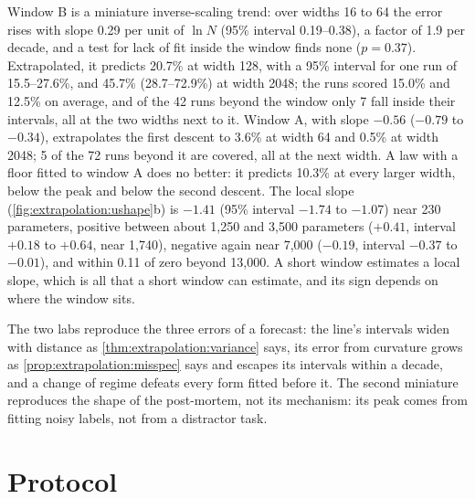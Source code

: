 \begin{refsection}
Window B is a miniature inverse-scaling trend: over widths 16 to 64 the error rises with slope 0.29 per unit of $\ln N$ (95\% interval 0.19--0.38), a factor of 1.9 per decade, and a test for lack of fit inside the window finds none ($p=0.37$). Extrapolated, it predicts 20.7\% at width 128, with a 95\% interval for one run of 15.5--27.6\%, and 45.7\% (28.7--72.9\%) at width 2048; the runs scored 15.0\% and 12.5\% on average, and of the 42 runs beyond the window only 7 fall inside their intervals, all at the two widths next to it. Window A, with slope $-0.56$ ($-0.79$ to $-0.34$), extrapolates the first descent to 3.6\% at width 64 and 0.5\% at width 2048; 5 of the 72 runs beyond it are covered, all at the next width. A law with a floor fitted to window A does no better: it predicts 10.3\% at every larger width, below the peak and below the second descent. The local slope (\cref{fig:extrapolation:ushape}b) is $-1.41$ (95\% interval $-1.74$ to $-1.07$) near 230 parameters, positive between about 1,250 and 3,500 parameters ($+0.41$, interval $+0.18$ to $+0.64$, near 1,740), negative again near 7,000 ($-0.19$, interval $-0.37$ to $-0.01$), and within 0.11 of zero beyond 13,000. A short window estimates a local slope, which is all that a short window can estimate, and its sign depends on where the window sits.

The two labs reproduce the three errors of a forecast: the line's intervals widen with distance as \cref{thm:extrapolation:variance} says, its error from curvature grows as \cref{prop:extrapolation:misspec} says and escapes its intervals within a decade, and a change of regime defeats every form fitted before it. The second miniature reproduces the shape of the post-mortem, not its mechanism: its peak comes from fitting noisy labels, not from a distractor task.

\section{Protocol}\label{sec:extrapolation:protocol}


\end{refsection}
